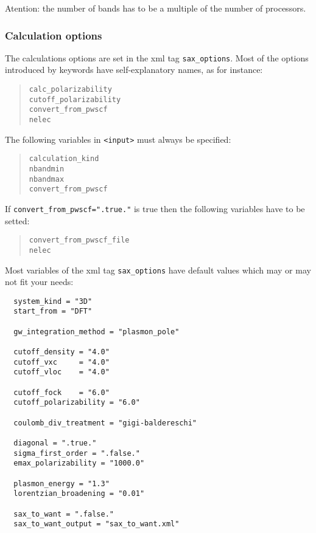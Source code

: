 \documentclass[11pt]{article}
\begin{document}
Atention: the number of bands has to be a multiple of the number of processors.

\subsubsection{Calculation options}
The calculations options are set in the xml tag \texttt{sax\_options}.
Most of the options introduced by keywords
have self-explanatory names, as for instance:

\begin{quote}
  \texttt{calc\_polarizability}\\
  \texttt{cutoff\_polarizability}\\ 
  \texttt{convert\_from\_pwscf}\\
  \texttt{nelec} 
\end{quote}

The following variables in \texttt{<input>} must always be
specified:
\begin{quote}
  \texttt{calculation\_kind}\\
  \texttt{nbandmin}\\
  \texttt{nbandmax}\\
  \texttt{convert\_from\_pwscf}\\
\end{quote}
If \texttt{convert\_from\_pwscf=".true."} is true then the following variables have to be setted:
\begin{quote}
  \texttt{convert\_from\_pwscf\_file}\\
  \texttt{nelec}\\
\end{quote}

Most variables of the xml tag \texttt{sax\_options} have default values which may or may not fit your needs:
\begin{verbatim}
  system_kind = "3D"
  start_from = "DFT"

  gw_integration_method = "plasmon_pole"

  cutoff_density = "4.0"
  cutoff_vxc     = "4.0"
  cutoff_vloc    = "4.0"

  cutoff_fock    = "6.0"
  cutoff_polarizability = "6.0"

  coulomb_div_treatment = "gigi-baldereschi"

  diagonal = ".true."
  sigma_first_order = ".false."
  emax_polarizability = "1000.0"

  plasmon_energy = "1.3"
  lorentzian_broadening = "0.01"

  sax_to_want = ".false."
  sax_to_want_output = "sax_to_want.xml"
\end{verbatim}
\end{document}
